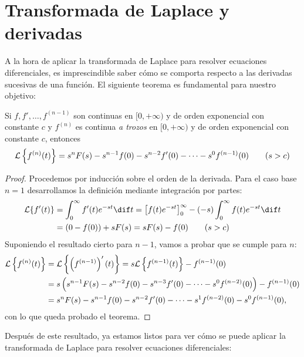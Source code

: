 \documentclass[../ecuaciones_diferenciales.tex]{subfiles}
\begin{document}
\section{Transformada de Laplace y derivadas}
A la hora de aplicar la transformada de Laplace para resolver ecuaciones
diferenciales, es imprescindible saber cómo se comporta respecto a las derivadas
sucesivas de una función. El siguiente teorema es fundamental para nuestro
objetivo:

\begin{theorem}
	Si \(f, f', \dots, f^{(n-1)}\) son continuas en \([0,+\infty)\) y de orden
	exponencial con constante \(c\) y \(f^{(n)}\) es continua \emph{a trozos} en
	\([0,+\infty)\) y de orden exponencial con constante \(c\), entonces
	\[\mathcal{L}\left\{f^{(n)}(t)\right\} = s^nF(s) - s^{n-1}f(0) - s^{n-2}f'(0) - \cdots -
		s^0f^{(n-1)}(0) \qquad (s>c)\]
	\begin{proof}
		Procedemos por inducción sobre el orden de la derivada. Para el caso base
		\(n=1\) desarrollamos la definición mediante integración por partes:
		\begin{align*}
			\L\{f'(t)\} & = \int_0^\infty f'(t)e^{-st} \dif t =
			\left[f(t)e^{-st}\right]_0^\infty - (-s) \int_0^\infty f(t)e^{-st} \dif t \\
			            & = (0-f(0)) + sF(s) = sF(s) - f(0) \qquad (s > c)
		\end{align*}
		Suponiendo el resultado cierto para \(n-1\), vamos a probar que se cumple
		para \(n\):
		\begin{align*}
			\mathcal{L}\left\{f^{(n)}(t)\right\}
			 & = \mathcal{L}\left\{\left(f^{(n-1)}\right)'(t)\right\}
			= s\mathcal{L}\left\{f^{(n-1)}(t)\right\} - f^{(n-1)}(0)        \\
			 & = s \left( s^{n-1}F(s) - s^{n-2}f(0) - s^{n-3}f'(0)
			- \cdots - s^0f^{(n-2)}(0) \right) - f^{(n-1)}(0)      \\
			 & = s^nF(s) - s^{n-1}f(0) - s^{n-2}f'(0) - \cdots
			- s^1f^{(n-2)}(0) - s^0f^{(n-1)}(0),
		\end{align*}
		con lo que queda probado el teorema.
	\end{proof}
\end{theorem}

Después de este resultado, ya estamos listos para ver cómo se puede aplicar la
transformada de Laplace para resolver ecuaciones diferenciales:
\end{document}
